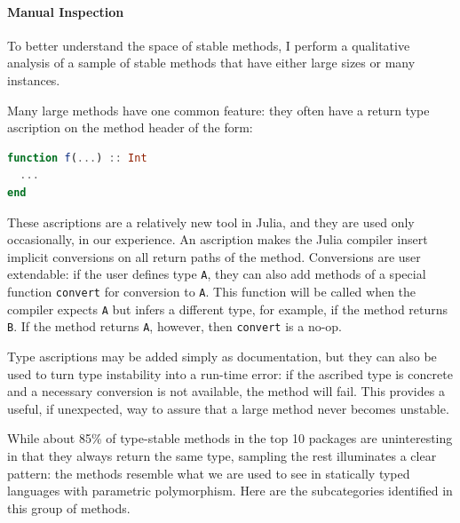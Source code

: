 \documentclass[oneside,openright,titlepage,numbers=noenddot,%
headinclude,footinclude,cleardoublepage=empty,abstract=on,
BCOR=5mm,paper=a4,fontsize=11pt,
dvipsnames
]{scrreprt}
\renewcommand{\c}[1]{\lstinline[language=Julia]!#1!\xspace}
\begin{document}
\paragraph{Manual Inspection}

To better understand the space of stable methods,
I perform a qualitative analysis of a sample of stable methods that
have either large sizes or many instances.

Many large methods have one common
feature: they often have a return type ascription on the method header of
the form:
\begin{lstlisting}[language=julia]
function f(...) :: Int
  ...
end
\end{lstlisting}
These ascriptions are a relatively new tool in Julia, and they are used only
occasionally, in our experience. An ascription makes the Julia compiler insert implicit
conversions on all return paths of the method. Conversions are user extendable:
if the user defines type \c{A}, they can also add methods of a special
function \c{convert} for conversion to \c{A}. This function will be called
when the compiler expects \c{A} but infers a different type, for example,
if the method returns \c{B}.
If the method returns \c{A}, however, then \c{convert} is a no-op.

Type ascriptions may be added simply as documentation, but they can also
be used to turn type instability into a run-time error:
if the ascribed type is concrete and a necessary conversion is not available,
the method will fail. This provides a useful, if
unexpected, way to assure that a large method never becomes unstable.

While about 85\% of type-stable methods in the top 10 packages are uninteresting
in that they always return the same type, sampling the rest illuminates
a clear pattern: the methods resemble what we
are used to see in statically typed languages with parametric polymorphism.
Here are the subcategories identified in this group of methods.
\end{document}
